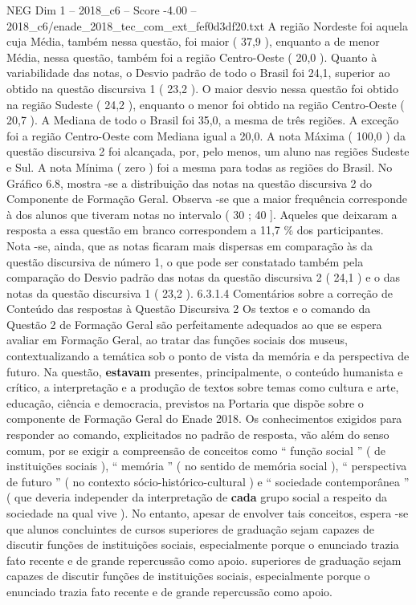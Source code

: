 \begin{textsample}{NEG Dim 1 – 2018\_c6 – Score -4.00 – 2018\_c6/enade\_2018\_tec\_com\_ext\_fef0d3df20.txt}
A região Nordeste foi aquela cuja Média, também nessa questão, foi maior ( 37,9 ), enquanto a de menor Média, nessa questão, também foi a região Centro-Oeste ( 20,0 ).
Quanto à variabilidade das notas, o Desvio padrão de todo o Brasil foi 24,1, superior ao obtido na questão discursiva 1 ( 23,2 ).
O maior desvio nessa questão foi obtido na região Sudeste ( 24,2 ), enquanto o menor foi obtido na região Centro-Oeste ( 20,7 ).
A Mediana de todo o Brasil foi 35,0, a mesma de três regiões.
A exceção foi a região Centro-Oeste com Mediana igual a 20,0.
A nota Máxima ( 100,0 ) da questão discursiva 2 foi alcançada, por, pelo menos, um aluno nas regiões Sudeste e Sul.
A nota Mínima ( zero ) foi a mesma para todas as regiões do Brasil.
No Gráfico 6.8, mostra -se a distribuição das notas na questão discursiva 2 do Componente de Formação Geral.
Observa -se que a maior frequência corresponde à dos alunos que tiveram notas no intervalo ( 30 ; 40 ].
Aqueles que deixaram a resposta a essa questão em branco correspondem a 11,7 \% dos participantes.
Nota -se, ainda, que as notas ficaram mais dispersas em comparação às da questão discursiva de número 1, o que pode ser constatado também pela comparação do Desvio padrão das notas da questão discursiva 2 ( 24,1 ) e o das notas da questão discursiva 1 ( 23,2 ). 6.3.1.4 Comentários sobre a correção de Conteúdo das respostas à Questão Discursiva 2 Os textos e o comando da Questão 2 de Formação Geral são perfeitamente adequados ao que se espera avaliar em Formação Geral, ao tratar das funções sociais dos museus, contextualizando a temática sob o ponto de vista da memória e da perspectiva de futuro.
Na questão, \textbf{estavam} presentes, principalmente, o conteúdo humanista e crítico, a interpretação e a produção de textos sobre temas como cultura e arte, educação, ciência e democracia, previstos na Portaria que dispõe sobre o componente de Formação Geral do Enade 2018.
Os conhecimentos exigidos para responder ao comando, explicitados no padrão de resposta, vão além do senso comum, por se exigir a compreensão de conceitos como “ função social ” ( de instituições sociais ), “ memória ” ( no sentido de memória social ), “ perspectiva de futuro ” ( no contexto sócio-histórico-cultural ) e “ sociedade contemporânea ” ( que deveria independer da interpretação de \textbf{cada} grupo social a respeito da sociedade na qual vive ).
No entanto, apesar de envolver tais conceitos, espera -se que alunos concluintes de cursos superiores de graduação sejam capazes de discutir funções de instituições sociais, especialmente porque o enunciado trazia fato recente e de grande repercussão como apoio. superiores de graduação sejam capazes de discutir funções de instituições sociais, especialmente porque o enunciado trazia fato recente e de grande repercussão como apoio.

\end{textsample}

